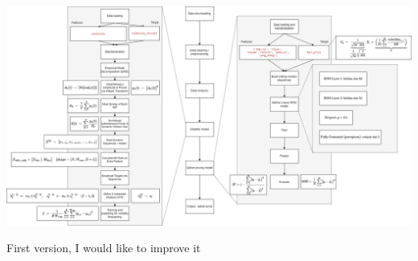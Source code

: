 \documentclass[letterpaper,11pt]{article}
\begin{document}
\begin{center}
\includegraphics[width=1\textwidth]{img/diagram.drawio.png}
\end{center}

First version, I would like to improve it
\end{document}
